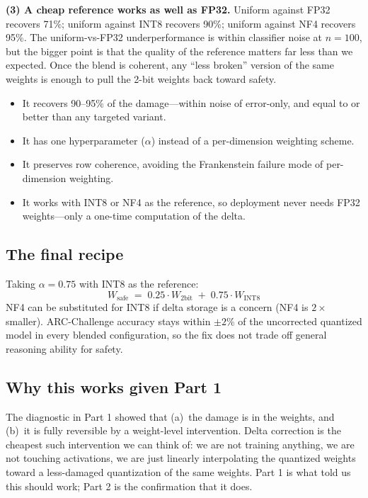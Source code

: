 \documentclass[11pt]{article}
\begin{document}
\textbf{(3) A cheap reference works as well as FP32.} Uniform against FP32 recovers 71\%; uniform against INT8 recovers 90\%; uniform against NF4 recovers 95\%. The uniform-vs-FP32 underperformance is within classifier noise at $n=100$, but the bigger point is that the quality of the reference matters far less than we expected. Once the blend is coherent, any ``less broken'' version of the same weights is enough to pull the 2-bit weights back toward safety.

\begin{findingbox}
\begin{itemize}
    \item It recovers 90--95\% of the damage---within noise of error-only, and equal to or better than any targeted variant.
    \item It has one hyperparameter ($\alpha$) instead of a per-dimension weighting scheme.
    \item It preserves row coherence, avoiding the Frankenstein failure mode of per-dimension weighting.
    \item It works with INT8 or NF4 as the reference, so deployment never needs FP32 weights---only a one-time computation of the delta.
\end{itemize}
\end{findingbox}

\subsection{The final recipe}

Taking $\alpha = 0.75$ with INT8 as the reference:
\[
W_{\text{safe}} \;=\; 0.25 \cdot W_{\text{2bit}} \;+\; 0.75 \cdot W_{\text{INT8}}
\]
NF4 can be substituted for INT8 if delta storage is a concern (NF4 is $2\times$ smaller). ARC-Challenge accuracy stays within $\pm 2$\% of the uncorrected quantized model in every blended configuration, so the fix does not trade off general reasoning ability for safety.

\subsection{Why this works given Part 1}

The diagnostic in Part 1 showed that (a)~the damage is in the weights, and (b)~it is fully reversible by a weight-level intervention. Delta correction is the cheapest such intervention we can think of: we are not training anything, we are not touching activations, we are just linearly interpolating the quantized weights toward a less-damaged quantization of the same weights. Part 1 is what told us this should work; Part 2 is the confirmation that it does.
\end{document}
